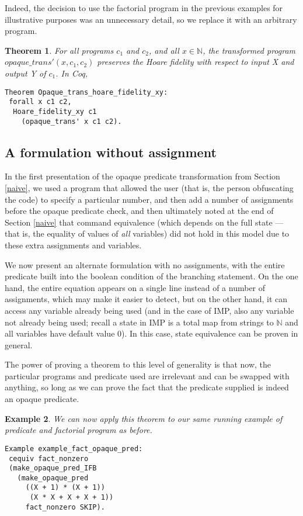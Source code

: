 \documentclass[compsoc,conference,a4paper,10pt,times]{IEEEtran}
\newtheorem{theorem}{Theorem}[section]
\newtheorem{example}[theorem]{Example}
\begin{document}
Indeed, the decision to use the factorial program in the previous examples for illustrative purposes was an unnecessary detail, so we replace it with an arbitrary program.

\begin{theorem}\label{hoare_xy_main}
For all programs $c_1$ and $c_2$, and all $x \in \mathbb{N}$, the transformed program $opaque\_trans'(x, c_1, c_2)$ preserves the Hoare fidelity with respect to input X and output Y of $c_1$.  
In Coq, \begin{verbatim}
Theorem Opaque_trans_hoare_fidelity_xy: 
 forall x c1 c2,
  Hoare_fidelity_xy c1 
    (opaque_trans' x c1 c2).
\end{verbatim}
\end{theorem}

\subsection{A formulation without assignment}\label{noass}
In the first presentation of the opaque predicate transformation from Section \ref{naive}, we used a program that allowed
the user (that is, the person obfuscating the code) to specify a particular number, and then add a number of assignments before the
opaque predicate check, and then ultimately noted at the end of Section \ref{naive} that command equivalence (which depends on the full state --- that is, the equality of values of \emph{all} variables) did not
hold in this model due to these extra assignments and variables.
\par
We now present an alternate formulation with no assignments, with the entire predicate
built into the boolean condition of the branching statement. On the one hand, the entire
equation appears on a single line instead of a number of assignments, which may make it
easier to detect, but on the other hand, it can access any variable already being used (and
in the case of IMP, also any variable not already being used; recall a state in IMP is a total map
from strings to $\mathbb{N}$ and all variables have default value 0).  In this case, state equivalence can be proven in general.

The power of proving a theorem to this level of generality is that now, the particular programs and predicate used are irrelevant and can be swapped with anything, so long as we can prove the fact that the predicate supplied is indeed an opaque predicate.

\begin{example}\label{factopaqueex}
We can now apply this theorem to our same running example of predicate and factorial program as before.
\begin{verbatim}
Example example_fact_opaque_pred: 
 cequiv fact_nonzero 
 (make_opaque_pred_IFB 
   (make_opaque_pred 
     ((X + 1) * (X + 1)) 
      (X * X + X + X + 1)) 
     fact_nonzero SKIP).
\end{verbatim}
\end{example}
\end{document}
